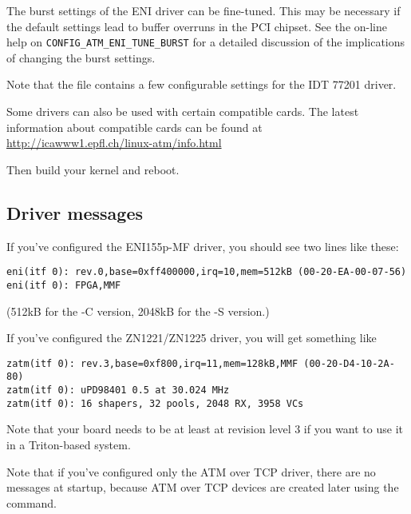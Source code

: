 

The burst settings of the ENI driver can be fine-tuned. This may be necessary
if the default settings lead to buffer overruns in the PCI chipset. See the
on-line help on \verb"CONFIG_ATM_ENI_TUNE_BURST" for a detailed discussion
of the implications of changing the burst settings.

Note that the file  contains a few configurable
settings for the IDT 77201 driver.

Some drivers can also be used with certain compatible cards. The latest
information about compatible cards can be found at
\url{http://icawww1.epfl.ch/linux-atm/info.html}

Then build your kernel and reboot.


\subsection{Driver messages}

If you've configured the ENI155p-MF driver, you should see two lines like
these:
{\footnotesize
\begin{verbatim}
eni(itf 0): rev.0,base=0xff400000,irq=10,mem=512kB (00-20-EA-00-07-56)
eni(itf 0): FPGA,MMF
\end{verbatim}}
(512kB for the -C version, 2048kB for the -S version.)

If you've configured the ZN1221/ZN1225 driver, you will get something like
{\footnotesize
\begin{verbatim}
zatm(itf 0): rev.3,base=0xf800,irq=11,mem=128kB,MMF (00-20-D4-10-2A-80)
zatm(itf 0): uPD98401 0.5 at 30.024 MHz
zatm(itf 0): 16 shapers, 32 pools, 2048 RX, 3958 VCs
\end{verbatim}}
Note that your board needs to be at least at revision level 3 if you want
to use it in a Triton-based system.

Note that if you've configured only the ATM over TCP driver, there are no
messages at startup, because ATM over TCP devices are created later using
the  command.


